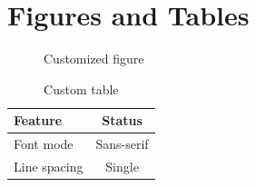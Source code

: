 \documentclass[
    language=english,
    doctype=book,              %
    institution=none,        %
    oneside,                 %
    loadGlossaries=true,          %
]{../../omnilatex}
\begin{document}
\chapter{Figures and Tables}

\begin{figure}[htbp]
    \centering
    \caption{Customized figure}
    \label{fig:custom}
\end{figure}

\begin{table}[htbp]
    \centering
    \caption{Custom table}
    \begin{tabular}{lc}
        \toprule
        \textbf{Feature} & \textbf{Status} \\
        \midrule
        Font mode        & Sans-serif      \\
        Line spacing     & Single          \\
        \bottomrule
    \end{tabular}
\end{table}

\printbibliography
\end{document}
